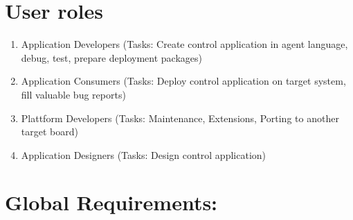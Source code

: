 \documentclass{scrreprt}
\begin{document}
\section{User roles}
\renewcommand{\labelenumi}{R_UR_\arabic{enumi}}
\begin{enumerate}

\item Application Developers (Tasks: Create control application in agent language, debug, test, prepare deployment packages)

\item Application Consumers  (Tasks: Deploy control application on target system, fill valuable bug reports)

\item Plattform Developers (Tasks: Maintenance, Extensions, Porting to another target board)

\item Application Designers (Tasks: Design control application)
\end{enumerate}


\section{Global Requirements: }
\end{document}
